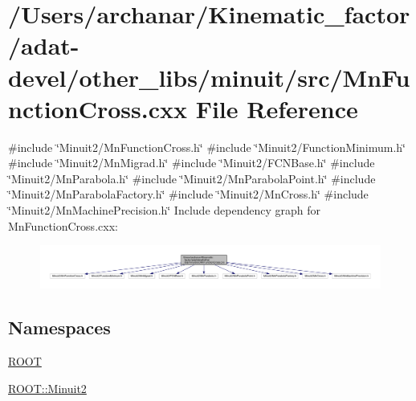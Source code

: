\hypertarget{adat-devel_2other__libs_2minuit_2src_2MnFunctionCross_8cxx}{}\section{/\+Users/archanar/\+Kinematic\+\_\+factor/adat-\/devel/other\+\_\+libs/minuit/src/\+Mn\+Function\+Cross.cxx File Reference}
\label{adat-devel_2other__libs_2minuit_2src_2MnFunctionCross_8cxx}
{\ttfamily \#include \char`\"{}Minuit2/\+Mn\+Function\+Cross.\+h\char`\"{}}\newline
{\ttfamily \#include \char`\"{}Minuit2/\+Function\+Minimum.\+h\char`\"{}}\newline
{\ttfamily \#include \char`\"{}Minuit2/\+Mn\+Migrad.\+h\char`\"{}}\newline
{\ttfamily \#include \char`\"{}Minuit2/\+F\+C\+N\+Base.\+h\char`\"{}}\newline
{\ttfamily \#include \char`\"{}Minuit2/\+Mn\+Parabola.\+h\char`\"{}}\newline
{\ttfamily \#include \char`\"{}Minuit2/\+Mn\+Parabola\+Point.\+h\char`\"{}}\newline
{\ttfamily \#include \char`\"{}Minuit2/\+Mn\+Parabola\+Factory.\+h\char`\"{}}\newline
{\ttfamily \#include \char`\"{}Minuit2/\+Mn\+Cross.\+h\char`\"{}}\newline
{\ttfamily \#include \char`\"{}Minuit2/\+Mn\+Machine\+Precision.\+h\char`\"{}}\newline
Include dependency graph for Mn\+Function\+Cross.\+cxx\+:
\nopagebreak
\begin{figure}[H]
\begin{center}
\leavevmode
\includegraphics[width=350pt]{de/d7b/adat-devel_2other__libs_2minuit_2src_2MnFunctionCross_8cxx__incl}
\end{center}
\end{figure}
\subsection*{Namespaces}
\begin{DoxyCompactItemize}
\item 
 \mbox{\hyperlink{namespaceROOT}{R\+O\+OT}}
\item 
 \mbox{\hyperlink{namespaceROOT_1_1Minuit2}{R\+O\+O\+T\+::\+Minuit2}}
\end{DoxyCompactItemize}
